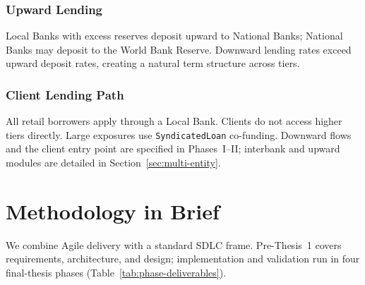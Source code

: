 \documentclass[12pt,a4paper]{report}
\begin{document}
\subsubsection{Upward Lending}

Local Banks with excess reserves deposit upward to National Banks; National Banks may deposit to the World Bank Reserve. Downward lending rates exceed upward deposit rates, creating a natural term structure across tiers.

\subsubsection{Client Lending Path}

All retail borrowers apply through a Local Bank. Clients do not access higher tiers directly. Large exposures use \texttt{SyndicatedLoan} co-funding. Downward flows and the client entry point are specified in Phases~I--II; interbank and upward modules are detailed in Section~\ref{sec:multi-entity}.

\section{Methodology in Brief}
\label{sec:methodology-brief}

We combine Agile delivery with a standard SDLC frame. Pre-Thesis~1 covers requirements, architecture, and design; implementation and validation run in four final-thesis phases (Table~\ref{tab:phase-deliverables}).
\end{document}
